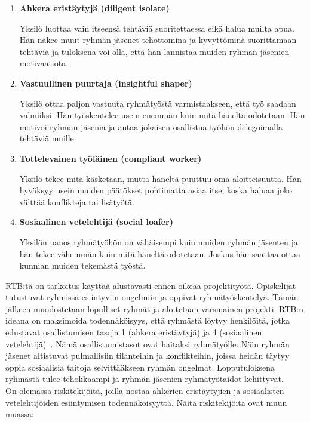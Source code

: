 \documentclass[finnish]{../tktltiki2}
\theoremstyle{definition}
\theoremstyle{remark}
\begin{document}
\begin{itemize}
\begin{enumerate}
\item {\bf Ahkera eristäytyjä (diligent isolate)}

Yksilö luottaa vain itseensä tehtäviä suoritettaessa eikä halua muilta apua. Hän näkee
muut ryhmän jäsenet tehottomina ja kyvyttöminä suorittamaan tehtäviä ja tuloksena voi olla, että
hän lannistaa muiden ryhmän jäsenien motivaatiota.

\item {\bf Vastuullinen puurtaja (insightful shaper)}

Yksilö ottaa paljon vastuuta ryhmätyöstä varmistaakseen, että
työ saadaan valmiiksi. Hän työskentelee usein enemmän kuin mitä
häneltä odotetaan. Hän motivoi ryhmän jäseniä ja antaa jokaisen
osallistua työhön delegoimalla tehtäviä muille.

\item {\bf Tottelevainen työläinen (compliant worker)}

Yksilö tekee mitä käsketään, mutta häneltä puuttuu oma-aloittei\-suutta. Hän hyväksyy usein muiden päätökset pohtimatta
asiaa itse, koska haluaa joko välttää konflikteja tai lisätyötä.

\item {\bf Sosiaalinen vetelehtijä (social loafer)}

Yksilön panos ryhmätyöhön on vähäisempi kuin muiden ryhmän jäsenten ja hän
tekee vähemmän kuin mitä häneltä odotetaan. Joskus hän saattaa ottaa kunnian muiden
tekemästä työstä.

\end{enumerate}

RTB:tä on tarkoitus käyttää alustavasti ennen oikeaa projektityötä. Opiskelijat tutustuvat ryhmissä esiintyviin ongelmiin ja oppivat ryhmä\-työskentelyä. Tämän jälkeen muodostetaan lopulliset ryhmät ja aloitetaan varsinainen projekti.
RTB:n ideana on maksimoida todennäköisyys, että ryhmästä löytyy henkilöitä, jotka edustavat osallistumisen tasoja 1 (ahkera eristäytyjä) ja 4 (sosiaalinen vetelehtijä)~\cite{Pieterse:2012:PPS:2157136.2157218}. Nämä osallistumistasot ovat haitaksi ryhmätyölle. Näin ryhmän jäsenet altistuvat pulmallisiin tilanteihin ja konflikteihin, joissa heidän täytyy oppia sosiaalisia taitoja selvittääkseen ryhmän ongelmat. Lopputuloksena ryhmästä tulee tehokkaampi ja ryhmän jäsenien ryhmätyötaidot kehittyvät.\\

On olemassa riskitekijöitä, joilla nostaa ahkerien eristäytyjien ja sosiaalisten vetelehtijöiden esiintymisen todennäköisyyttä. Näitä riskitekijöitä ovat muun muassa:


\end{itemize}
\end{document}
